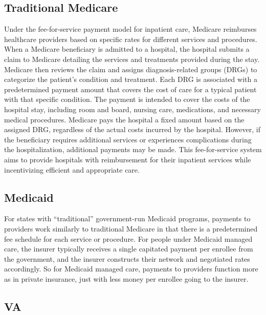 \documentclass[
  letterpaper,
  DIV=11,
  numbers=noendperiod]{scrreport}
\theoremstyle{definition}
\theoremstyle{remark}
\begin{document}
\hypertarget{traditional-medicare-1}{%
\subsection*{Traditional Medicare}\label{traditional-medicare-1}}

Under the fee-for-service payment model for inpatient care, Medicare
reimburses healthcare providers based on specific rates for different
services and procedures. When a Medicare beneficiary is admitted to a
hospital, the hospital submits a claim to Medicare detailing the
services and treatments provided during the stay. Medicare then reviews
the claim and assigns diagnosis-related groups (DRGs) to categorize the
patient's condition and treatment. Each DRG is associated with a
predetermined payment amount that covers the cost of care for a typical
patient with that specific condition. The payment is intended to cover
the costs of the hospital stay, including room and board, nursing care,
medications, and necessary medical procedures. Medicare pays the
hospital a fixed amount based on the assigned DRG, regardless of the
actual costs incurred by the hospital. However, if the beneficiary
requires additional services or experiences complications during the
hospitalization, additional payments may be made. This fee-for-service
system aims to provide hospitals with reimbursement for their inpatient
services while incentivizing efficient and appropriate care.

\hypertarget{medicaid-1}{%
\subsection*{Medicaid}\label{medicaid-1}}

For states with ``traditional'' government-run Medicaid programs,
payments to providers work similarly to traditional Medicare in that
there is a predetermined fee schedule for each service or procedure. For
people under Medicaid managed care, the insurer typically receives a
single capitated payment per enrollee from the government, and the
insurer constructs their network and negotiated rates accordingly. So
for Medicaid managed care, payments to providers function more as in
private insurance, just with less money per enrollee going to the
insurer.

\hypertarget{va}{%
\subsection*{VA}\label{va}}
\end{document}
